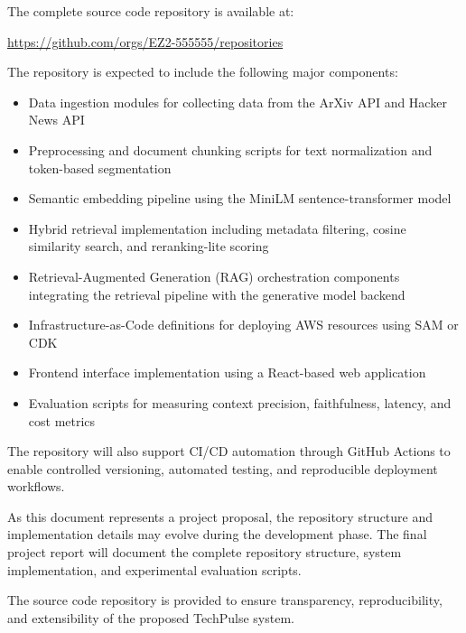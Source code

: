 \documentclass[12pt,a4paper]{report}
\begin{document}
\begin{flushleft}
The complete source code repository is available at:

\begin{center}
\url{https://github.com/orgs/EZ2-555555/repositories}
\end{center}

The repository is expected to include the following major components:

\begin{itemize}

\item Data ingestion modules for collecting data from the ArXiv API and Hacker News API

\item Preprocessing and document chunking scripts for text normalization and token-based segmentation

\item Semantic embedding pipeline using the MiniLM sentence-transformer model

\item Hybrid retrieval implementation including metadata filtering, cosine similarity search, and reranking-lite scoring

\item Retrieval-Augmented Generation (RAG) orchestration components integrating the retrieval pipeline with the generative model backend

\item Infrastructure-as-Code definitions for deploying AWS resources using SAM or CDK

\item Frontend interface implementation using a React-based web application

\item Evaluation scripts for measuring context precision, faithfulness, latency, and cost metrics

\end{itemize}

The repository will also support CI/CD automation through GitHub Actions to enable controlled versioning, automated testing, and reproducible deployment workflows.

As this document represents a project proposal, the repository structure and implementation details may evolve during the development phase. The final project report will document the complete repository structure, system implementation, and experimental evaluation scripts.

The source code repository is provided to ensure transparency, reproducibility, and extensibility of the proposed TechPulse system.


\end{flushleft}
\end{document}
